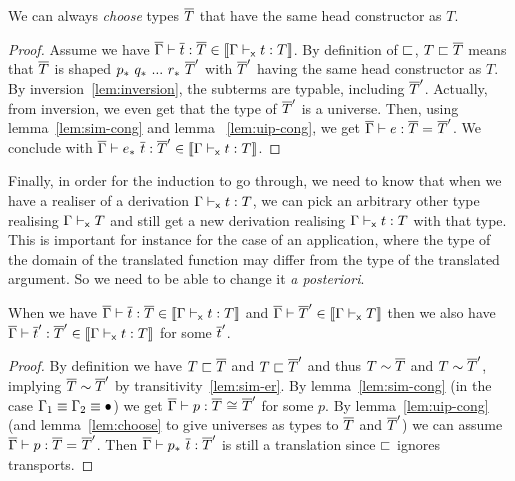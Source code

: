 \begin{lemma}
  \label{lem:choose}
  We can always \emph{choose} types $\overline{T}$ that have the same head constructor
  as $T$.
\end{lemma}

\begin{proof}
  Assume we have $\overline{\Gamma} \vdash \overline{t} : \overline{T} \in \llbracket \Gamma \vdash_{\mathsf{x}} t : T \rrbracket$.
  By definition of $\sqsubset$,
  $T \sqsubset \overline{T}$ means that $\overline{T}$ is shaped
  $\transpo{p}\ \transpo{q}\ ...\ \transpo{r}\ \Tb'$ with $\overline{T}'$ having
  the same head constructor as $T$. By inversion~\eqref{lem:inversion}, the
  subterms are typable, including $\overline{T}'$. Actually, from inversion, we
  even get that the type of $\overline{T}'$ is a universe. Then,
  using lemma~\ref{lem:sim-cong} and lemma~
  \ref{lem:uip-cong}, we get $\overline{\Gamma} \vdash e : \overline{T} =_{} \overline{T}'$.
  We conclude with
  $\isterm{\Gb}{\transpo{e}\ \tb}{\Tb'} \in \trans{\xisterm{\Ga}{t}{T}}$.
\end{proof}

Finally, in order for the induction to go through, we need to know
that when we have a realiser of a derivation $\Gamma \vdash_{\mathsf{x}} t : T$, we can
pick an arbitrary other type realising $\Gamma \vdash_{\mathsf{x}} T$ and still
get a new derivation realising $\Gamma \vdash_{\mathsf{x}} t : T$ with that type.
%
This is important for instance for the case of an application, where
the type of the domain of the translated function may differ from the
type of the translated argument. So we need to be able to change it \textit{a
posteriori}.


\begin{lemma}
  \label{lem:change-type}
  When we have $\overline{\Gamma} \vdash \overline{t} : \overline{T} \in \llbracket \Gamma \vdash_{\mathsf{x}} t : T \rrbracket$
  and $\overline{\Gamma} \vdash \overline{T}' \in \llbracket \Gamma \vdash_{\mathsf{x}} T \rrbracket$ then we also have
  $\overline{\Gamma} \vdash \overline{t}' : \overline{T}' \in \llbracket \Gamma \vdash_{\mathsf{x}} t : T \rrbracket$ for some $\overline{t}'$.
\end{lemma}

\begin{proof}
  By definition we have $T \sqsubset \overline{T}$ and $T \sqsubset \overline{T}'$ and thus $T \sim \overline{T}$ and
  $T \sim \overline{T}'$, implying $\overline{T} \sim \overline{T}'$ by transitivity~\eqref{lem:sim-er}.
  By lemma~\ref{lem:sim-cong}
  (in the case $\Gamma_1 \equiv \Gamma_2 \equiv \bullet$) we get
  $\overline{\Gamma} \vdash p : \overline{T} \mathrel{{}_{}{\cong}_{}} \overline{T}'$ for some $p$.
  By lemma~\ref{lem:uip-cong} (and lemma~\ref{lem:choose} to give
  universes as types to $\overline{T}$ and $\overline{T}'$) we can assume
  $\overline{\Gamma} \vdash p : \overline{T} =_{} \overline{T}'$. Then
  $\overline{\Gamma} \vdash p_*\ \overline{t} : \overline{T}'$ is still a translation since $\sqsubset$
  ignores transports.
\end{proof}

